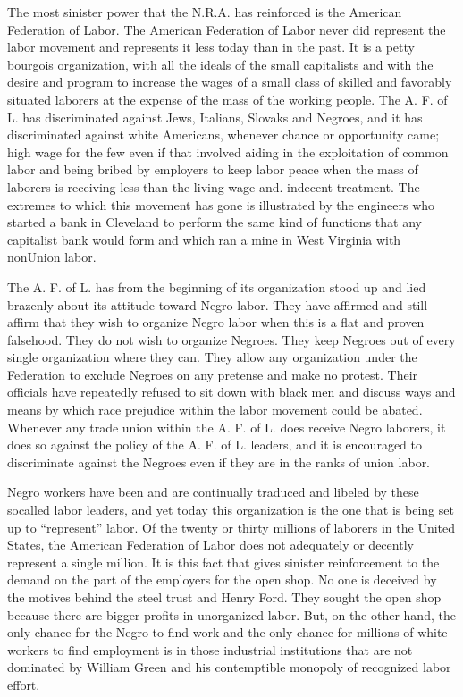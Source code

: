 \documentclass[letterpaper,10pt,english]{jupyterBook}
\begin{document}
\sphinxAtStartPar
The most sinister power that the N.R.A. has re\sphinxhyphen{}inforced is the American Federation of Labor. The American Federation of Labor never did represent the labor movement and represents it less today than in the past. It is a petty bourgois organization, with all the ideals of the small capitalists and with the desire and program to increase the wages of a small class of skilled and favorably situated laborers at the expense of the mass of the working people. The A. F. of L. has discriminated against Jews, Italians, Slovaks and Negroes, and it has discriminated against white Americans, whenever chance or opportunity came; high wage for the few even if that involved aiding in the exploitation of common labor and being bribed by employers to keep labor peace when the mass of laborers is receiving less than the living wage and. indecent treatment. The extremes to which this movement has gone is illustrated by the engineers who started a bank in Cleveland to perform the same kind of functions that any capitalist bank would form and which ran a mine in West Virginia with non\sphinxhyphen{}Union labor.

\sphinxAtStartPar
The A. F. of L. has from the beginning of its organization stood up and lied brazenly about its attitude toward Negro labor. They have affirmed and still affirm that they wish to organize Negro labor when this is a flat and proven falsehood. They do not wish to organize Negroes. They keep Negroes out of every single organization where they can. They allow any organization under the Federation to exclude Negroes on any pretense and make no protest. Their officials have repeatedly refused to sit down with black men and discuss ways and means by which race prejudice within the labor movement could be abated. Whenever any trade union within the A. F. of L. does receive Negro laborers, it does so against the policy of the A. F. of L. leaders, and it is encouraged to discriminate against the Negroes even if they are in the ranks of union labor.

\sphinxAtStartPar
Negro workers have been and are continually traduced and libeled by these so\sphinxhyphen{}called labor leaders, and yet today this organization is the one that is being set up to “represent” labor. Of the twenty or thirty millions of laborers in the United States, the American Federation of Labor does not adequately or decently represent a single million. It is this fact that gives sinister reinforcement to the demand on the part of the employers for the open shop. No one is deceived by the motives behind the steel trust and Henry Ford. They sought the open shop because there are bigger profits in unorganized labor. But, on the other hand, the only chance for the Negro to find work and the only chance for millions of white workers to find employment is in those industrial institutions that are not dominated by William Green and his contemptible monopoly of recognized labor effort.
\end{document}
